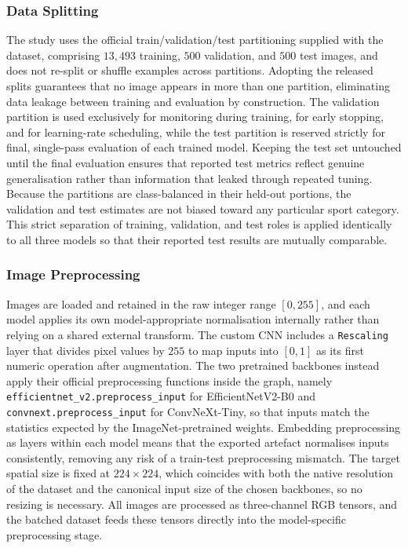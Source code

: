 \subsubsection{Data Splitting}
\label{subsubsec:method-split}

The study uses the official train/validation/test partitioning supplied with the dataset, comprising $13{,}493$ training, $500$ validation, and $500$ test images, and does not re-split or shuffle examples across partitions.
Adopting the released splits guarantees that no image appears in more than one partition, eliminating data leakage between training and evaluation by construction.
The validation partition is used exclusively for monitoring during training, for early stopping, and for learning-rate scheduling, while the test partition is reserved strictly for final, single-pass evaluation of each trained model.
Keeping the test set untouched until the final evaluation ensures that reported test metrics reflect genuine generalisation rather than information that leaked through repeated tuning.
Because the partitions are class-balanced in their held-out portions, the validation and test estimates are not biased toward any particular sport category.
This strict separation of training, validation, and test roles is applied identically to all three models so that their reported test results are mutually comparable.

\subsubsection{Image Preprocessing}
\label{subsubsec:method-preprocessing}

Images are loaded and retained in the raw integer range $[0,255]$, and each model applies its own model-appropriate normalisation internally rather than relying on a shared external transform.
The custom CNN includes a \texttt{Rescaling} layer that divides pixel values by $255$ to map inputs into $[0,1]$ as its first numeric operation after augmentation.
The two pretrained backbones instead apply their official preprocessing functions inside the graph, namely \texttt{efficientnet\_v2.preprocess\_input} for EfficientNetV2-B0 and \texttt{convnext.preprocess\_input} for ConvNeXt-Tiny, so that inputs match the statistics expected by the ImageNet-pretrained weights.
Embedding preprocessing as layers within each model means that the exported artefact normalises inputs consistently, removing any risk of a train-test preprocessing mismatch.
The target spatial size is fixed at $224\times224$, which coincides with both the native resolution of the dataset and the canonical input size of the chosen backbones, so no resizing is necessary.
All images are processed as three-channel RGB tensors, and the batched dataset feeds these tensors directly into the model-specific preprocessing stage.

